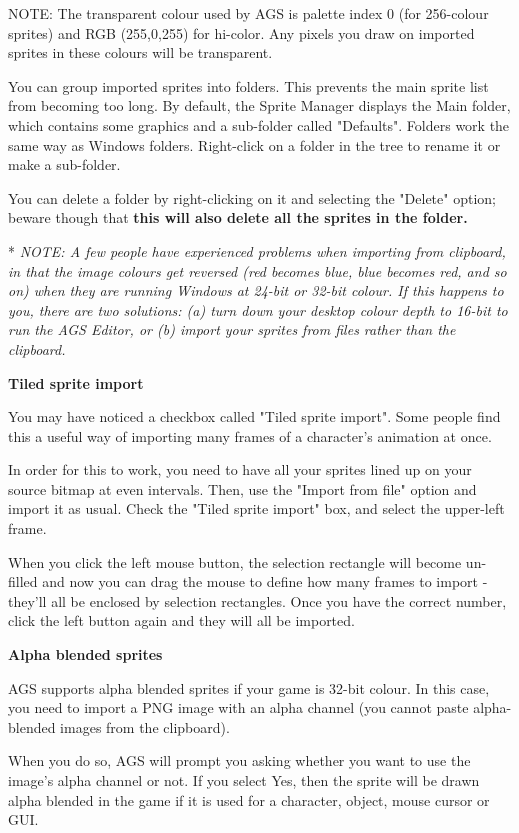 NOTE: The transparent colour used by AGS is palette index 0 (for 256-colour
sprites) and RGB (255,0,255) for hi-color. Any pixels you draw on imported
sprites in these colours will be transparent.

You can group imported sprites into folders. This prevents the main sprite
list from becoming too long. By default, the Sprite Manager displays the
Main folder, which contains some graphics and a sub-folder called "Defaults".
Folders work the same way as Windows folders. Right-click on a folder in the
tree to rename it or make a sub-folder.

You can delete a folder by right-clicking on it and selecting the "Delete"
option; beware though that \bf{this will also delete all the sprites in the folder}.

* \it{NOTE: A few people have experienced problems when importing from clipboard,
in that the image colours get reversed (red becomes blue, blue becomes red, and so on)
when they are running Windows at 24-bit or 32-bit colour. If this happens to you, there
are two solutions: (a) turn down your desktop colour depth to 16-bit to run the AGS Editor,
or (b) import your sprites from files rather than the clipboard.}

\bf{Tiled sprite import}

You may have noticed a checkbox called "Tiled sprite import". Some people find
this a useful way of importing many frames of a character's animation at once.

In order for this to work, you need to have all your sprites lined up on your
source bitmap at even intervals. Then, use the "Import from file" option and import it
as usual. Check the "Tiled sprite import" box, and select the upper-left frame.

When you click the left mouse button, the selection rectangle will become un-filled
and now you can drag the mouse to define how many frames to import - they'll all
be enclosed by selection rectangles. Once you have the correct number, click the left
button again and they will all be imported.

\bf{Alpha blended sprites}

AGS supports alpha blended sprites if your game is 32-bit colour. In this case, you
need to import a PNG image with an alpha channel (you cannot paste alpha-blended
images from the clipboard).

When you do so, AGS will prompt you asking whether you want to use the image's alpha
channel or not. If you select Yes, then the sprite will be drawn alpha blended in
the game if it is used for a character, object, mouse cursor or GUI.

